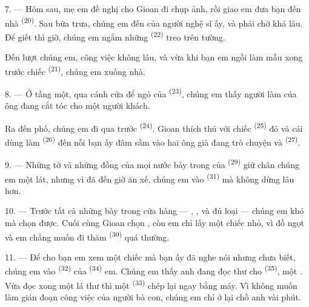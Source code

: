 \VUsaut{3.0mm}

7. --- Hôm sau, mẹ em đề nghị cho Gioan đi chụp ảnh, rồi giao em đưa bạn đến nhà
 \textsuperscript{(20)}. Sau bữa trưa, chúng em đến  của
người nghệ sĩ ấy, và phải chờ khá lâu. Để giết thì giờ, chúng em ngắm những  \textsuperscript{(22)} treo trên tường.

Đến lượt chúng em, công việc không lâu, và vừa khi bạn em ngồi làm mẫu xong trước chiếc
 \textsuperscript{(21)}, chúng em xuống nhà.

8. --- Ở tầng một, qua cánh cửa để ngỏ của 
\textsuperscript{(23)}, chúng em thấy người làm của ông đang cắt tóc cho một người khách.

Ra đến phố, chúng em đi qua trước  \textsuperscript{(24)}. Gioan
thích thú với chiếc  \textsuperscript{(25)} đỏ và cái 
dùng làm  \textsuperscript{(26)} đến nỗi bạn ấy đâm sầm vào hai ông già
đang trò chuyện và  \textsuperscript{(27)}.

\VUsaut{3.0mm}

9. --- Những tờ  và những đồng  của mọi nước bày
trong  của  \textsuperscript{(29)} giữ chân chúng
em một lát, nhưng vì đã đến giờ ăn xế, chúng em vào 
\textsuperscript{(31)} mà không dừng lâu hơn.

10. --- Trước tất cả những  bày trong cửa hàng — , ,  và đủ loại  — chúng em khó
mà chọn được. Cuối cùng Gioan chọn , còn em chỉ lấy một chiếc
 nhỏ, vì đồ ngọt  và em chẳng muốn đi
thăm  \textsuperscript{(30)} quá thường.

\VUsaut{3.0mm}

11. --- Để cho bạn em xem một chiếc  mà bạn ấy đã nghe nói nhưng chưa
biết, chúng em vào  \textsuperscript{(32)} của 
\textsuperscript{(34)} em. Chúng em thấy anh đang đọc thư cho 
\textsuperscript{(35)}, một . Vừa đọc xong một lá thư thì một
 \textsuperscript{(33)} chép lại ngay bằng máy. Vì không muốn làm
gián đoạn công việc của người bà con, chúng em chỉ ở lại chỗ anh vài phút.


